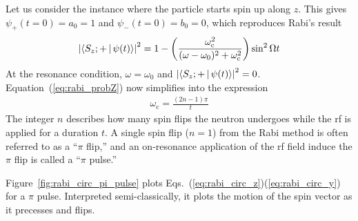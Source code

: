 %
Let us consider the instance where the particle starts spin up along $z$. This gives $\psi_+(t=0)=a_0=1$ and $\psi_-(t=0)=b_0=0$, which reproduces Rabi's result \cite{rabi_1938}
%
\begin{gather}
    \left| \Braket{S_z;+ | \psi(t)} \right|^2 = 1-\left( \frac{\omega_\text{c}^2}{(\omega -\omega_0)^2+\omega_\text{c}^2} \right) \sin^2\Omega t \label{eq:rabi_probZ}
\end{gather}
%
At the resonance condition, $\omega=\omega_0$ and $\left| \Braket{S_z;+ | \psi(t)} \right|^2=0$. Equation~(\ref{eq:rabi_probZ}) now simplifies into the expression
%
\begin{gather}
    \omega_\text{c}=\frac{(2n-1)\pi}{t} \label{eq:rabi_pi_pulse_time}
\end{gather}
%
The integer $n$ describes how many spin flips the neutron undergoes while the \acrshort*{rf} is applied for a duration $t$. A single spin flip ($n=1$) from the Rabi method is often referred to as a ``$\pi$ flip,'' and an on-resonance application of the \acrshort*{rf} field induce the $\pi$ flip is called a ``$\pi$ pulse.''

Figure~\ref{fig:rabi_circ_pi_pulse} plots Eqs.~(\ref{eq:rabi_circ_z})\textendash (\ref{eq:rabi_circ_y}) for a $\pi$ pulse. Interpreted semi-classically, it plots the motion of the spin vector as it precesses and flips.

